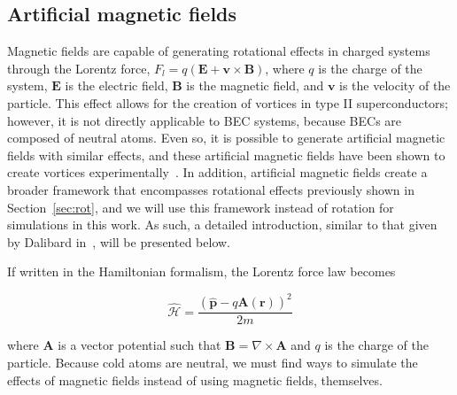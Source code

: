 \subsection{Artificial magnetic fields}
\label{sec:gauge}

Magnetic fields are capable of generating rotational effects in charged systems through the Lorentz force, $F_l = q(\mathbf{E} + \mathbf{v} \times \mathbf{B})$, where $q$ is the charge of the system, $\mathbf{E}$ is the electric field, $\mathbf{B}$ is the magnetic field, and $\mathbf{v}$ is the velocity of the particle.
This effect allows for the creation of vortices in type II superconductors; however, it is not directly applicable to BEC systems, because BECs are composed of neutral atoms.
Even so, it is possible to generate artificial magnetic fields with similar effects, and these artificial magnetic fields have  been shown to create vortices experimentally~\cite{lin2009}.
In addition, artificial magnetic fields create a broader framework that encompasses rotational effects previously shown in Section~\ref{sec:rot}, and we will use this framework instead of rotation for simulations in this work.
As such, a detailed introduction, similar to that given by Dalibard in~\cite{dalibard2015}, will be presented below.

If written in the Hamiltonian formalism, the Lorentz force law becomes

\begin{equation}
\mathcal{\hat{H}} = \frac{(\mathbf{\hat p} - q\mathbf{A}(\mathbf{r}))^2}{2m}
\end{equation}

\noindent where $\mathbf{A}$ is a vector potential such that $\mathbf{B} = \nabla \times \mathbf{A}$ and $q$ is the charge of the particle.
Because cold atoms are neutral, we must find ways to simulate the effects of magnetic fields instead of using magnetic fields, themselves.

